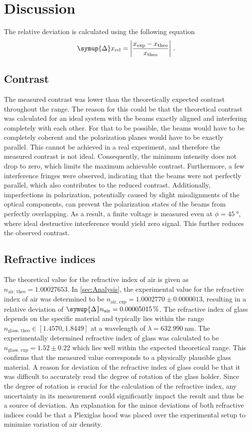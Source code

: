 \section{Discussion}
\label{sec:Discussion}
The relative deviation is calculated using the following equation
\begin{equation*}
    \symup{\Delta} x_{\text{rel}} = \left| \frac{x_{\text{exp}} - x_{{\text{theo}}}}{x_{{\text{theo}}}}\right|\,.
\end{equation*}
\subsection{Contrast}
The measured contrast was lower than the theoretically expected contrast throughout the range. The reason for this could be 
that the theoretical contrast was calculated for an ideal system with the beams exactly aligned and interfering completely with each other. 
For that to be possible, the beams would have to be completely coherent and the polarization planes would have to be exactly parallel.
This cannot be achieved in 
a real experiment, and therefore the measured contrast is not ideal. Consequently, the minimum intensity does not drop to zero, which limits the maximum achievable contrast.
Furthermore, a few interference fringes were observed, indicating that the beams were not perfectly parallel, which also contributes to the reduced contrast.
Additionally, imperfections in polarization, potentially caused by slight misalignments of the optical components, can prevent the polarization states of the beams from perfectly overlapping.
As a result, a finite voltage is measured even at $\phi=\SI{45}{\degree}$, where ideal destructive interference would yield zero signal. This further reduces the observed contrast. 

\subsection{Refractive indices}
The theoretical value for the refractive index of air is given as $n_{\text{air, theo}}=1.00027653$. 
In \autoref{sec:Analysis}, the experimental value for the refractive index of air was determined to be 
$n_{\text{air, exp}} = 1.0002770\pm0.0000013$, resulting in a relative deviation of $\symup{\Delta}n_{\text{air}} = 0.00005015\,\%$. 
The refractive index of 
glass depends on the specific material and typically lies within the range $n_{\text{glass, theo}}\in [1.4570, 1.8449]$ at a 
wavelength of $\lambda = \SI{632.990}{\nano\meter}$. 
The experimentally determined refractive index of glass was calculated to be $n_{\text{glass, exp}} = 1.52\pm0.22$ which lies 
well within the expected theoretical range. 
This confirms that the measured value corresponds to a physically plausible glass material.
A reason for deviation of the refractive index of glass could be that it was difficult to accurately read the degree of rotation 
of the glass holder. 
Since the degree of rotation is crucial for the calculation of the refractive index, any uncertainty in its measurement could significantly impact the result and thus be a source of deviation.
An explanation for the minor deviations of both refractive indices could be that a Plexiglas hood was placed over the 
experimental setup to minimize 
variation of air density.